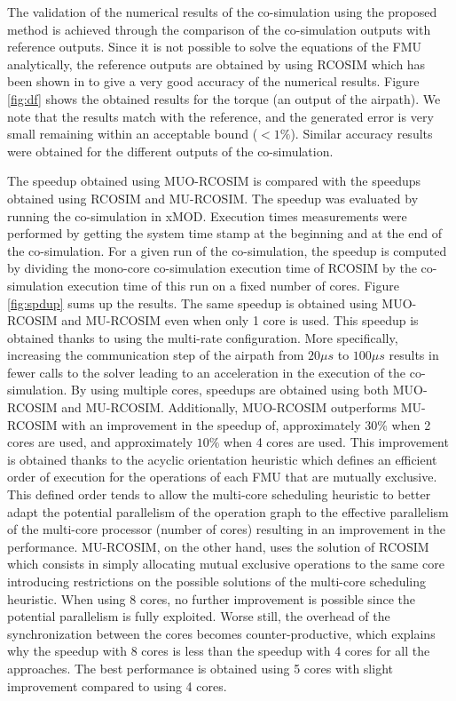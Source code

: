 The validation of the numerical results of the co-simulation using the proposed method is achieved through the comparison of the co-simulation outputs with reference outputs. Since it is not possible to solve the equations of the FMU analytically, the reference outputs are obtained by using RCOSIM which has been shown in \cite{benkhaled:2014} to give a very good accuracy of the numerical results. Figure \ref{fig:df} shows the obtained results for the torque (an output of the airpath). We note that the results match with the reference, and the generated error is very small remaining within an acceptable bound ($< 1\%$). Similar accuracy results were obtained for the different outputs of the co-simulation.

The speedup obtained using MUO-RCOSIM is compared with the speedups obtained using RCOSIM and MU-RCOSIM. The speedup was evaluated by running the co-simulation in xMOD. Execution times measurements were performed by getting the system time stamp at the beginning and at the end of the co-simulation. For a given run of the co-simulation, the speedup is computed by dividing the mono-core co-simulation execution time of RCOSIM by the co-simulation execution time of this run on a fixed number of cores. Figure \ref{fig:spdup} sums up the results. The same speedup is obtained using MUO-RCOSIM and MU-RCOSIM even when only 1 core is used. This speedup is obtained thanks to using the multi-rate configuration. More specifically, increasing the communication step of the airpath from $20 {\mu}s$ to $100 {\mu}s$ results in fewer calls to the solver leading to an acceleration in the execution of the co-simulation. By using multiple cores, speedups are obtained using both MUO-RCOSIM and MU-RCOSIM. Additionally, MUO-RCOSIM outperforms MU-RCOSIM with an improvement in the speedup of, approximately $30\%$ when 2 cores are used, and approximately $10\%$ when 4 cores are used. This improvement is obtained thanks to the acyclic orientation heuristic which defines an efficient order of execution for the operations of each FMU that are mutually exclusive. This defined order tends to allow the multi-core scheduling heuristic to better adapt the potential parallelism of the operation graph to the effective parallelism of the multi-core processor (number of cores) resulting in an improvement in the performance. MU-RCOSIM, on the other hand, uses the solution of RCOSIM which consists in simply allocating mutual exclusive operations to the same core introducing restrictions on the possible solutions of the multi-core scheduling heuristic. When using 8 cores, no further improvement is possible since the potential parallelism is fully exploited. Worse still, the overhead of the synchronization between the cores becomes counter-productive, which explains why the speedup with 8 cores is less than the speedup with 4 cores for all the approaches. The best performance is obtained using 5 cores with slight improvement compared to using 4 cores. 

